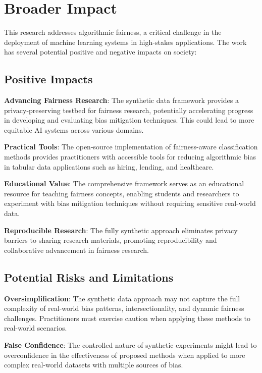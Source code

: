 \section*{Broader Impact}

This research addresses algorithmic fairness, a critical challenge in the deployment of machine learning systems in high-stakes applications. The work has several potential positive and negative impacts on society:

\subsection*{Positive Impacts}

\textbf{Advancing Fairness Research}: The synthetic data framework provides a privacy-preserving testbed for fairness research, potentially accelerating progress in developing and evaluating bias mitigation techniques. This could lead to more equitable AI systems across various domains.

\textbf{Practical Tools}: The open-source implementation of fairness-aware classification methods provides practitioners with accessible tools for reducing algorithmic bias in tabular data applications such as hiring, lending, and healthcare.

\textbf{Educational Value}: The comprehensive framework serves as an educational resource for teaching fairness concepts, enabling students and researchers to experiment with bias mitigation techniques without requiring sensitive real-world data.

\textbf{Reproducible Research}: The fully synthetic approach eliminates privacy barriers to sharing research materials, promoting reproducibility and collaborative advancement in fairness research.

\subsection*{Potential Risks and Limitations}

\textbf{Oversimplification}: The synthetic data approach may not capture the full complexity of real-world bias patterns, intersectionality, and dynamic fairness challenges. Practitioners must exercise caution when applying these methods to real-world scenarios.

\textbf{False Confidence}: The controlled nature of synthetic experiments might lead to overconfidence in the effectiveness of proposed methods when applied to more complex real-world datasets with multiple sources of bias.

